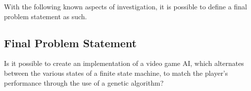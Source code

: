 With the following known aspects of investigation, it is possible to define a final problem statement as such.


\subsection{Final Problem Statement} \label{sec:finalproblemstatement}
Is it possible to create an implementation of a video game AI, which alternates between the various states of a finite state machine, to match the player's performance through the use of a genetic algorithm?
